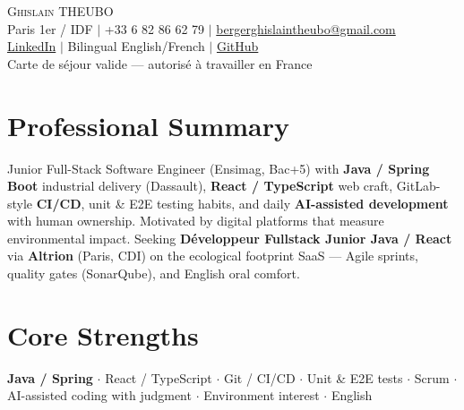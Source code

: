 \documentclass[letterpaper,10.5pt]{article}
\begin{document}
\begin{center}
{\Huge \scshape Ghislain THEUBO} \\ \vspace{2pt}
\small Paris 1er / IDF $|$ +33 6 82 86 62 79 $|$ \href{mailto:bergerghislaintheubo@gmail.com}{bergerghislaintheubo@gmail.com} \\
\href{https://www.linkedin.com/in/berger-ghislain}{LinkedIn} $|$ Bilingual English/French $|$ \href{https://github.com/Bergerghislain}{GitHub} \\
\small Carte de s\'ejour valide --- autoris\'e \`a travailler en France
\end{center}
\vspace{-6pt}
\section{Professional Summary}
\small{Junior Full-Stack Software Engineer (Ensimag, Bac+5) with \textbf{Java / Spring Boot} industrial delivery (Dassault), \textbf{React / TypeScript} web craft, GitLab-style \textbf{CI/CD}, unit \& E2E testing habits, and daily \textbf{AI-assisted development} with human ownership. Motivated by digital platforms that measure environmental impact. Seeking \textbf{D\'eveloppeur Fullstack Junior Java / React} via \textbf{Altrion} (Paris, CDI) on the ecological footprint SaaS --- Agile sprints, quality gates (SonarQube), and English oral comfort.}
\section{Core Strengths}
\small{\textbf{Java / Spring} $\cdot$ React / TypeScript $\cdot$ Git / CI/CD $\cdot$ Unit \& E2E tests $\cdot$ Scrum $\cdot$ AI-assisted coding with judgment $\cdot$ Environment interest $\cdot$ English}
\end{document}
